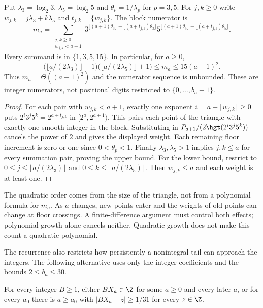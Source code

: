 \begin{lemma}
\label{long269:res:literal-triangle}
Put $\lambda_3=\log_2 3$, $\lambda_5=\log_2 5$ and
$\theta_p=1/\lambda_p$ for $p=3,5$.
For $j,k\ge0$ write $w_{j,k}=j\lambda_3+k\lambda_5$ and
$t_{j,k}=\{w_{j,k}\}$.  The block numerator is
\[
 m_a=\sum_{\substack{j,k\ge0\\w_{j,k}<a+1}}
 3^{\lfloor(a+1)\theta_3\rfloor-\lfloor(a+t_{j,k})\theta_3\rfloor}
 5^{\lfloor(a+1)\theta_5\rfloor-\lfloor(a+t_{j,k})\theta_5\rfloor}.
\]
Every summand is in $\{1,3,5,15\}$.  In particular, for $a\ge0$,
\[
 \bigl(\lfloor a/(2\lambda_3)\rfloor+1\bigr)
 \bigl(\lfloor a/(2\lambda_5)\rfloor+1\bigr)
 \le m_a\le15(a+1)^2.
\]
Thus $m_a=\Theta((a+1)^2)$ and the numerator sequence is unbounded.
These are integer numerators, not positional digits restricted to
$\{0,\ldots,b_a-1\}$.
\end{lemma}
\begin{proof}
For each pair with $w_{j,k}<a+1$, exactly one exponent
$i=a-\lfloor w_{j,k}\rfloor\ge0$ puts
$2^i3^j5^k=2^{a+t_{j,k}}$ in $[2^a,2^{a+1})$.
This pairs each point of the triangle with exactly one smooth integer
in the block.  Substituting in
$P_{a+1}/(2\hgt(2^i3^j5^k))$ cancels the power of $2$ and gives the displayed
weight.  Each remaining floor increment is zero or one since
$0<\theta_p<1$.  Finally $\lambda_3,\lambda_5>1$ implies
$j,k\le a$ for every summation pair, proving the upper bound.
For the lower bound, restrict to
$0\le j\le\lfloor a/(2\lambda_3)\rfloor$ and
$0\le k\le\lfloor a/(2\lambda_5)\rfloor$.
Then $w_{j,k}\le a$ and each weight is at least one.
\end{proof}
The quadratic order comes from the size of the triangle, not from a
polynomial formula for $m_a$. As $a$ changes, new points enter and the
weights of old points can change at floor crossings. A finite-difference
argument must control both effects; polynomial growth alone cancels neither.
Quadratic growth does not make this count a quadratic polynomial.

The recurrence also restricts how persistently a nonintegral tail can
approach the integers.  The following alternative uses only the integer
coefficients and the bounds $2\le b_a\le30$.

\begin{proposition}\label{long269:res:actual-dichotomy}
For every integer $B\ge1$, either $BX_a\in\Z$ for some $a\ge0$ and every
later $a$, or for every $a_0$ there is $a\ge a_0$ with
$|BX_a-z|\ge1/31$ for every $z\in\Z$.
\end{proposition}

